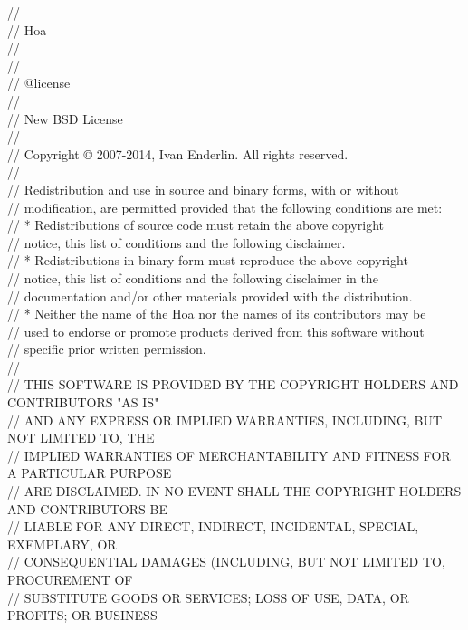 \begin{bigbigpre}
// \\
// Hoa \\
// \\
// \\
// @license \\
// \\
// New BSD License \\
// \\
// Copyright © 2007-2014, Ivan Enderlin. All rights reserved. \\
// \\
// Redistribution and use in source and binary forms, with or without \\
// modification, are permitted provided that the following conditions are met: \\
//     * Redistributions of source code must retain the above copyright \\
//       notice, this list of conditions and the following disclaimer. \\
//     * Redistributions in binary form must reproduce the above copyright \\
//       notice, this list of conditions and the following disclaimer in the \\
//       documentation and/or other materials provided with the distribution. \\
//     * Neither the name of the Hoa nor the names of its contributors may be \\
//       used to endorse or promote products derived from this software without \\
//       specific prior written permission. \\
// \\
// THIS SOFTWARE IS PROVIDED BY THE COPYRIGHT HOLDERS AND CONTRIBUTORS "AS IS" \\
// AND ANY EXPRESS OR IMPLIED WARRANTIES, INCLUDING, BUT NOT LIMITED TO, THE \\
// IMPLIED WARRANTIES OF MERCHANTABILITY AND FITNESS FOR A PARTICULAR PURPOSE \\
// ARE DISCLAIMED. IN NO EVENT SHALL THE COPYRIGHT HOLDERS AND CONTRIBUTORS BE \\
// LIABLE FOR ANY DIRECT, INDIRECT, INCIDENTAL, SPECIAL, EXEMPLARY, OR \\
// CONSEQUENTIAL DAMAGES (INCLUDING, BUT NOT LIMITED TO, PROCUREMENT OF \\
// SUBSTITUTE GOODS OR SERVICES; LOSS OF USE, DATA, OR PROFITS; OR BUSINESS \\

\end{bigbigpre}

